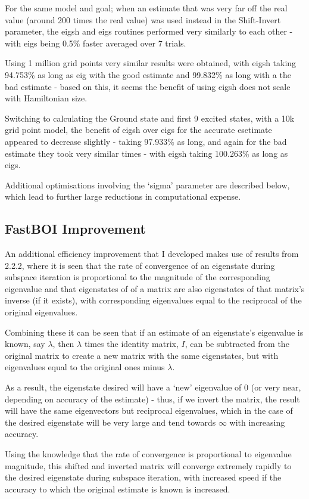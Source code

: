 For the same model and goal; when an estimate that was very far off the real value (around 200 times the real value) was used instead in the Shift-Invert parameter, the eigsh and eigs routines performed very similarly to each other - with eigs being 0.5\% faster averaged over 7 trials.

Using 1 million grid points very similar results were obtained, with eigsh taking 94.753\% as long as eig with the good estimate and 99.832\% as long with a the bad estimate - based on this, it seems the benefit of using eigsh does not scale with Hamiltonian size.

Switching to calculating the Ground state and first 9 excited states, with a 10k grid point model, the benefit of eigsh over eigs for the accurate esetimate appeared to decrease slightly - taking 97.933\% as long, and again for the bad estimate they took very similar times - with eigsh taking 100.263\% as long as eigs.

Additional optimisations involving the `sigma' parameter are described below, which lead to further large reductions in computational expense.

\subsection{FastBOI Improvement}
An additional efficiency improvement that I developed makes use of results from 2.2.2, where it is seen that the rate of convergence of an eigenstate during subspace iteration is proportional to the magnitude of the corresponding eigenvalue and that eigenstates of of a matrix are also eigenstates of that matrix's inverse (if it exists), with corresponding eigenvalues equal to the reciprocal of the original eigenvalues. 

Combining these it can be seen that if an estimate of an eigenstate's eigenvalue is known, say $\lambda$, then $\lambda$ times the identity matrix, $I$, can be subtracted from the original matrix to create a new matrix with the same eigenstates, but with eigenvalues equal to the original ones minus $\lambda$. 

As a result, the eigenstate desired will have a `new' eigenvalue of $0$ (or very near, depending on accuracy of the estimate) - thus, if we invert the matrix, the result will have the same eigenvectors but reciprocal eigenvalues, which in the case of the desired eigenstate will be very large and tend towards $\infty$ with increasing accuracy. 

Using the knowledge that the rate of convergence is proportional to eigenvalue magnitude, this shifted and inverted matrix will converge extremely rapidly to the desired eigenstate during subspace iteration, with increased speed if the accuracy to which the original estimate is known is increased.

